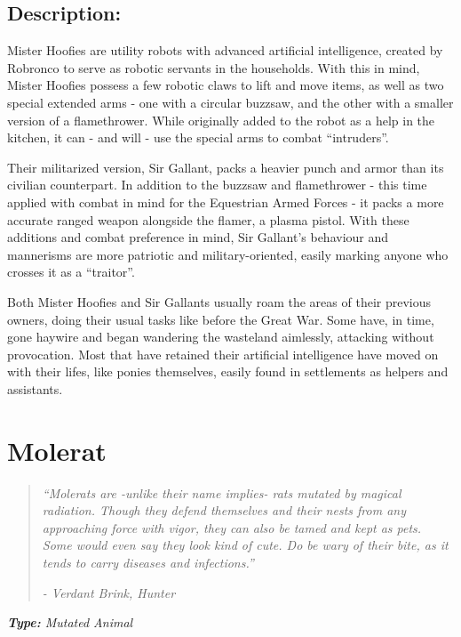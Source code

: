 \documentclass[11pt,a4paper,twocolumn]{book}
\begin{document}
	\subsection*{Description:}
	Mister Hoofies are utility robots with advanced artificial intelligence, created by Robronco to serve as robotic servants in the households. With this in mind, Mister Hoofies possess a few robotic claws to lift and move items, as well as two special extended arms - one with a circular buzzsaw, and the other with a smaller version of a flamethrower. While originally added to the robot as a help in the kitchen, it can - and will - use the special arms to combat ``intruders''.
	
	Their militarized version, Sir Gallant, packs a heavier punch and armor than its civilian counterpart. In addition to the buzzsaw and flamethrower - this time applied with combat in mind for the Equestrian Armed Forces - it packs a more accurate ranged weapon alongside the flamer, a plasma pistol. With these additions and combat preference in mind, Sir Gallant's behaviour and mannerisms are more patriotic and military-oriented, easily marking anyone who crosses it as a ``traitor''. 
	
	\bigskip
	Both Mister Hoofies and Sir Gallants usually roam the areas of their previous owners, doing their usual tasks like before the Great War. Some have, in time, gone haywire and began wandering the wasteland aimlessly, attacking without provocation. Most that have retained their artificial intelligence have moved on with their lifes, like ponies themselves, easily found in settlements as helpers and assistants.
	
	
	\clearpage
	
	\section*{Molerat}
	\begin{quote}
		\emph{``Molerats are -unlike their name implies- rats mutated by magical radiation. Though they defend themselves and their nests from any approaching force with vigor, they can also be tamed and kept as pets. Some would even say they look kind of cute. Do be wary of their bite, as it tends to carry diseases and infections.''}
		
		\emph{-	Verdant Brink, Hunter}
	\end{quote}
	
	\noindent
	\emph{\textbf{Type:} Mutated Animal}
	
\end{document}
